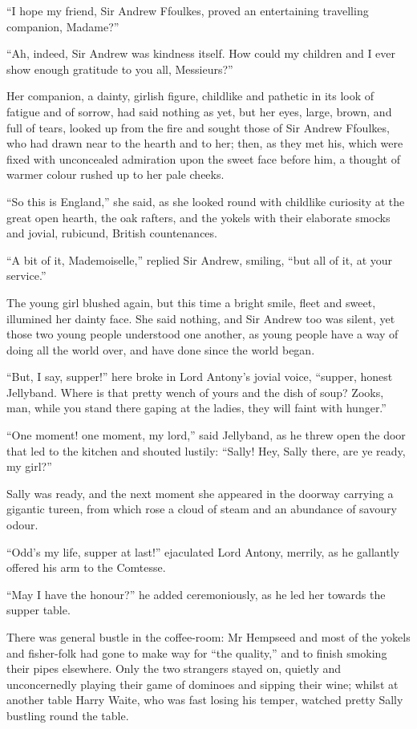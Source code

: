 \enquote{I hope my friend, Sir Andrew Ffoulkes, proved an entertaining travelling companion, Madame?}

\enquote{Ah, indeed, Sir Andrew was kindness itself. How could my children and I ever show enough gratitude to you all, Messieurs?}

Her companion, a dainty, girlish figure, childlike and pathetic in its look of fatigue and of sorrow, had said nothing as yet, but her eyes, large, brown, and full of tears, looked up from the fire and sought those of Sir Andrew Ffoulkes, who had drawn near to the hearth and to her; then, as they met his, which were fixed with unconcealed admiration upon the sweet face before him, a thought of warmer colour rushed up to her pale cheeks.

\enquote{So this is England,} she said, as she looked round with childlike curiosity at the great open hearth, the oak rafters, and the yokels with their elaborate smocks and jovial, rubicund, British countenances.

\enquote{A bit of it, Mademoiselle,} replied Sir Andrew, smiling, \enquote{but all of it, at your service.}

The young girl blushed again, but this time a bright smile, fleet and sweet, illumined her dainty face. She said nothing, and Sir Andrew too was silent, yet those two young people understood one another, as young people have a way of doing all the world over, and have done since the world began.

\enquote{But, I say, supper!} here broke in Lord Antony's jovial voice, \enquote{supper, honest Jellyband. Where is that pretty wench of yours and the dish of soup? Zooks, man, while you stand there gaping at the ladies, they will faint with hunger.}

\enquote{One moment! one moment, my lord,} said Jellyband, as he threw open the door that led to the kitchen and shouted lustily: \enquote{Sally! Hey, Sally there, are ye ready, my girl?}

Sally was ready, and the next moment she appeared in the doorway carrying a gigantic tureen, from which rose a cloud of steam and an abundance of savoury odour.

\enquote{Odd's my life, supper at last!} ejaculated Lord Antony, merrily, as he gallantly offered his arm to the Comtesse.

\enquote{May I have the honour?} he added ceremoniously, as he led her towards the supper table.

There was general bustle in the coffee-room: Mr Hempseed and most of the yokels and fisher-folk had gone to make way for \enquote{the quality,} and to finish smoking their pipes elsewhere. Only the two strangers stayed on, quietly and unconcernedly playing their game of dominoes and sipping their wine; whilst at another table Harry Waite, who was fast losing his temper, watched pretty Sally bustling round the table.

